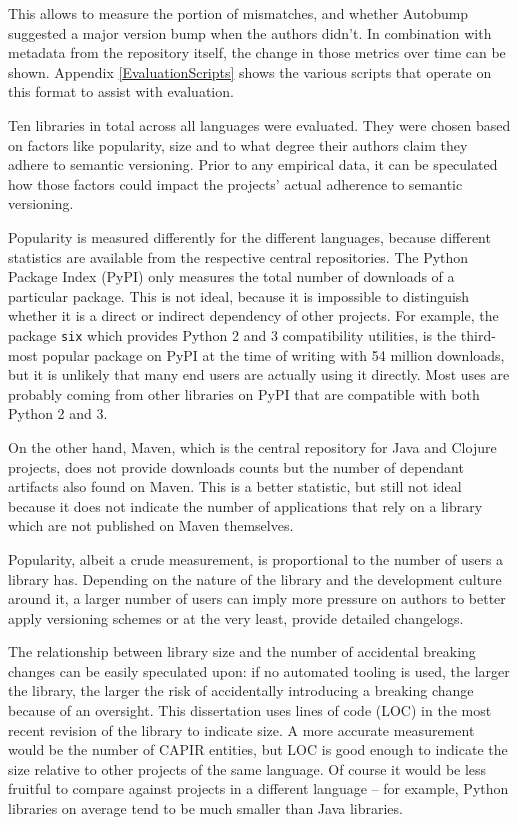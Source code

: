 \documentclass{l4proj}
\newcommand\genericstyle{\lstset{basicstyle=\ttm}}
\newcommand\codeinline[1]{{\genericstyle\lstinline!#1!}}
\begin{document}
This allows to measure the portion of mismatches, and whether Autobump
suggested a major version bump when the authors didn't. In combination
with metadata from the repository itself, the change in those metrics
over time can be shown. Appendix \ref{EvaluationScripts} shows the
various scripts that operate on this format to assist with evaluation.

Ten libraries in total across all languages were evaluated. They were
chosen based on factors like popularity, size and to what degree their
authors claim they adhere to semantic versioning. Prior to any
empirical data, it can be speculated how those factors could impact
the projects' actual adherence to semantic versioning.

Popularity is measured differently for the different languages, because
different statistics are available from the respective central
repositories. The Python Package Index (PyPI) \cite{PyPI} only measures
the total number of downloads of a particular package. This is not
ideal, because it is impossible to distinguish whether it is a direct
or indirect dependency of other projects. For example, the package
\codeinline{six} which provides Python 2 and 3 compatibility
utilities, is the third-most popular package on PyPI at the time of
writing with 54 million downloads, but it is unlikely that many end
users are actually using it directly. Most uses are probably coming
from other libraries on PyPI that are compatible with both Python 2
and 3.

On the other hand, Maven, which is the central repository for Java and
Clojure projects, does not provide downloads counts but the number of
dependant artifacts also found on Maven. This is a better statistic,
but still not ideal because it does not indicate the number of
applications that rely on a library which are not published on Maven
themselves.

Popularity, albeit a crude measurement, is proportional to the number
of users a library has. Depending on the nature of the library and the
development culture around it, a larger number of users can imply more
pressure on authors to better apply versioning schemes or at the very
least, provide detailed changelogs.

The relationship between library size and the number of accidental
breaking changes can be easily speculated upon: if no automated
tooling is used, the larger the library, the larger the risk of
accidentally introducing a breaking change because of an oversight.
This dissertation uses lines of code (LOC) in the most recent revision
of the library to indicate size. A more accurate measurement would be
the number of CAPIR entities, but LOC is good enough to indicate the
size relative to other projects of the same language. Of course it
would be less fruitful to compare against projects in a different
language -- for example, Python libraries on average tend to be much
smaller than Java libraries.
\end{document}
